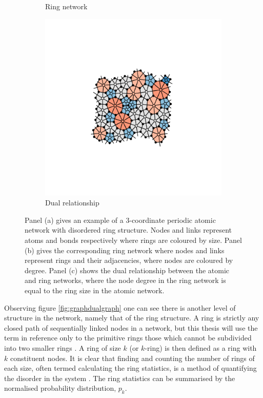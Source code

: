 \begin{figure}[bt]
\begin{subfigure}[b]{0.3\textwidth}
         \caption{Ring network}
         \label{fig:graphdualdual}
     \end{subfigure}
     \hfill
     \begin{subfigure}[b]{0.3\textwidth}
         \centering
         \includegraphics[width=\textwidth]{./figures/methods/graph_dual.pdf}
         \caption{Dual relationship}
         \label{}
     \end{subfigure}
     \hfill
     
     \caption{Panel (a) gives an example of a 3\--coordinate periodic atomic network with disordered ring structure. Nodes and links represent atoms and bonds respectively where rings are coloured by size. Panel (b) gives the corresponding ring network where nodes and links represent rings and their adjacencies, where nodes are coloured by degree. Panel (c) shows the dual relationship between the atomic and ring networks, where the node degree in the ring network is equal to the ring size in the atomic network.}
     \label{fig:graphdual}
\end{figure}

Observing figure \ref{fig:graphdualgraph} one can see there is another level of structure in the network, namely that of the ring structure.
A ring is strictly any closed path of sequentially linked nodes in a network, but this thesis will use the term in reference only to the primitive rings \ie{} those which cannot be subdivided into two smaller rings \cite{Yuan2002}.
A ring of size $k$ (or $k$\--ring) is then defined as a ring with $k$ constituent nodes.
It is clear that finding and counting the number of rings of each size, often termed calculating the ring statistics, is a method of quantifying the disorder in the system \cite{Kumar2014}.
The ring statistics can be summarised by the normalised probability distribution, $p_k$.

